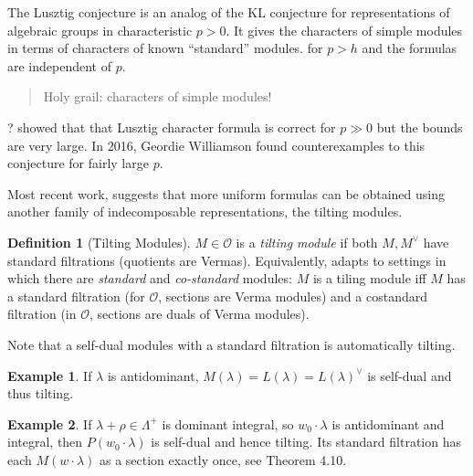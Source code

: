 \documentclass[11pt]{scrartcl}
\theoremstyle{definition}
\theoremstyle{theorem}
\theoremstyle{proof}
\theoremstyle{definition}
\newtheorem{definition}{Definition}[theorem]
\theoremstyle{break}
\newtheorem{example}{Example}[section]
\theoremstyle{problem}
\newcommand{\dual}[0]{^\vee}
\newcommand{\OO}[0]{{\mathcal{O}}}
\begin{document}
The Lusztig conjecture is an analog of the KL conjecture for
representations of algebraic groups in characteristic \(p> 0\). It gives
the characters of simple modules in terms of characters of known
``standard'' modules. for \(p > h\) and the formulas are independent of
\(p\).

\begin{quote}
Holy grail: characters of simple modules!
\end{quote}

? showed that that Lusztig character formula is correct for \(p \gg 0\)
but the bounds are very large. In 2016, Geordie Williamson found
counterexamples to this conjecture for fairly large \(p\).

Most recent work, suggests that more uniform formulas can be obtained
using another family of indecomposable representations, the tilting
modules.

\begin{definition}[Tilting Modules]

\(M\in \OO\) is a \emph{tilting module} if both \(M, M\dual\) have
standard filtrations (quotients are Vermas). Equivalently, adapts to
settings in which there are \emph{standard} and \emph{co-standard}
modules: \(M\) is a tiling module iff \(M\) has a standard filtration
(for \(\OO\), sections are Verma modules) and a costandard filtration
(in \(\OO\), sections are duals of Verma modules).\end{definition}

Note that a self-dual modules with a standard filtration is
automatically tilting.

\begin{example}

If \(\lambda\) is antidominant,
\(M(\lambda) = L(\lambda) = L(\lambda)\dual\) is self-dual and thus
tilting.\end{example}

\begin{example}

If \(\lambda + \rho \in \Lambda^+\) is dominant integral, so
\(w_0 \cdot \lambda\) is antidominant and integral, then
\(P(w_0 \cdot \lambda)\) is self-dual and hence tilting. Its standard
filtration has each \(M(w\cdot \lambda)\) as a section exactly once, see
Theorem 4.10.\end{example}
\end{document}

